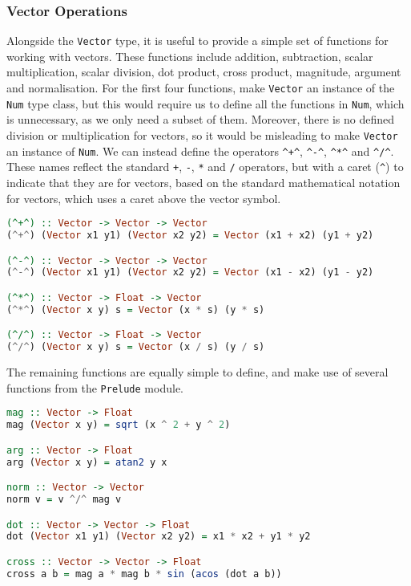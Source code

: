 \documentclass[../main.tex]{subfiles}
\begin{document}
            \subsubsection{Vector Operations}
                Alongside the \verb|Vector| type, it is useful to provide a simple set of
                    functions for working with vectors.
                These functions include addition, subtraction, scalar multiplication, scalar
                    division, dot product, cross product, magnitude, argument and normalisation.
                For the first four functions, make \verb|Vector| an instance of the \verb|Num|
                    type class, but this would require us to define all the functions in
                    \verb|Num|, which is unnecessary, as we only need a subset of them.
                Moreover, there is no defined division or multiplication for vectors, so it
                    would be misleading to make \verb|Vector| an instance of \verb|Num|.
                We can instead define the operators \verb|^+^|, \verb|^-^|, \verb|^*^| and
                    \verb|^/^|.
                These names reflect the standard \verb|+|, \verb|-|, \verb|*| and \verb|/|
                    operators, but with a caret (\verb|^|) to indicate that they are for vectors,
                    based on the standard mathematical notation for vectors, which uses a caret
                    above the vector symbol.

                \begin{lstlisting}[language=Haskell, label={lst:vectorOps}, morekeywords={Vector},
                caption={The vector operators.}]
(^+^) :: Vector -> Vector -> Vector
(^+^) (Vector x1 y1) (Vector x2 y2) = Vector (x1 + x2) (y1 + y2)

(^-^) :: Vector -> Vector -> Vector
(^-^) (Vector x1 y1) (Vector x2 y2) = Vector (x1 - x2) (y1 - y2)

(^*^) :: Vector -> Float -> Vector
(^*^) (Vector x y) s = Vector (x * s) (y * s)

(^/^) :: Vector -> Float -> Vector
(^/^) (Vector x y) s = Vector (x / s) (y / s)
            \end{lstlisting}

                The remaining functions are equally simple to define, and make use of several
                    functions from the \verb|Prelude| module.

                \begin{lstlisting}[language=Haskell, label={lst:vectorFns}, morekeywords={Vector},
                caption={The remaining vector functions.}]
mag :: Vector -> Float
mag (Vector x y) = sqrt (x ^ 2 + y ^ 2)

arg :: Vector -> Float
arg (Vector x y) = atan2 y x

norm :: Vector -> Vector
norm v = v ^/^ mag v

dot :: Vector -> Vector -> Float
dot (Vector x1 y1) (Vector x2 y2) = x1 * x2 + y1 * y2

cross :: Vector -> Vector -> Float
cross a b = mag a * mag b * sin (acos (dot a b))
            \end{lstlisting}
\end{document}
